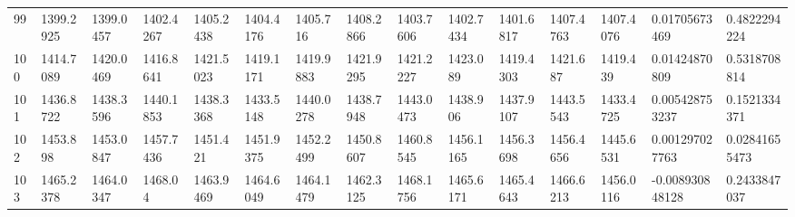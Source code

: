 \begin{landscape}
{\begin{longtable}{@{}lllllllllllllll@{}}
		99                                           & 1399.2925                & 1399.0457                & 1402.4267                & 1405.2438                & 1404.4176                & 1405.716                 & 1408.2866                & 1403.7606                & 1402.7434                & 1401.6817                & 1407.4763                & 1407.4076                & 0.01705673469                                                          & 0.4822294224                                    \\
		100                                          & 1414.7089                & 1420.0469                & 1416.8641                & 1421.5023                & 1419.1171                & 1419.9883                & 1421.9295                & 1421.2227                & 1423.089                 & 1419.4303                & 1421.687                 & 1419.439                 & 0.01424870809                                                          & 0.5318708814                                    \\
		101                                          & 1436.8722                & 1438.3596                & 1440.1853                & 1438.3368                & 1433.5148                & 1440.0278                & 1438.7948                & 1443.0473                & 1438.906                 & 1437.9107                & 1443.5543                & 1433.4725                & 0.005428753237                                                         & 0.1521334371                                    \\
		102                                          & 1453.898                 & 1453.0847                & 1457.7436                & 1451.421                 & 1451.9375                & 1452.2499                & 1450.8607                & 1460.8545                & 1456.1165                & 1456.3698                & 1456.4656                & 1445.6531                & 0.001297027763                                                         & 0.02841655473                                   \\
		103                                          & 1465.2378                & 1464.0347                & 1468.04                  & 1463.9469                & 1464.6049                & 1464.1479                & 1462.3125                & 1468.1756                & 1465.6171                & 1465.4643                & 1466.6213                & 1456.0116                & -0.008930848128                                                        & 0.2433847037                                    \\

\end{longtable}}
\end{landscape}
